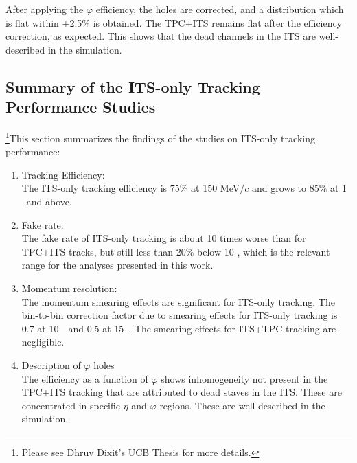 
After applying the $\varphi$ efficiency, the holes are corrected, and a distribution which is flat within {$\pm$2.5\%} is obtained. The TPC+ITS remains flat after the efficiency correction, as expected. This shows that the dead channels in the ITS are well-described in the simulation. 

\subsection{Summary of the ITS-only Tracking Performance Studies}
\label{sec:sys_tracking}
\footnote{Please see Dhruv Dixit's UCB Thesis for more details.}This section summarizes the findings of the studies on ITS-only tracking performance: 
\begin{enumerate}
\item Tracking Efficiency: \\
The ITS-only tracking efficiency is $75\%$ at 150 MeV/$c$ and grows to 85$\%$ at 1 \GeVc~and above. 
\item Fake rate:\\
The fake rate of ITS-only tracking is about 10 times worse than for TPC+ITS tracks, but still less than 20$\%$ below 10 \GeVc, which is the relevant range for the analyses presented in this work.
\item Momentum resolution:\\
The momentum smearing effects are significant for ITS-only tracking. The bin-to-bin correction factor due to smearing effects for ITS-only tracking is 0.7 at 10~\GeVc~and 0.5 at 15~\GeVc. The smearing effects for ITS+TPC tracking are negligible.
\item Description of $\varphi$ holes\\
The efficiency as a function of $\varphi$ shows inhomogeneity not present in the TPC+ITS tracking that are attributed to dead staves in the ITS. These are concentrated in specific $\eta$ and $\varphi$ regions. These are well described in the simulation. 
\end{enumerate}

